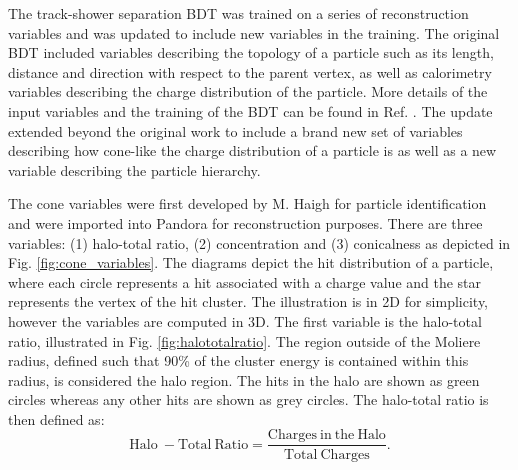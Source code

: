 The track-shower separation BDT was trained on a series of reconstruction variables and was updated to include new variables in the training.
The original BDT included variables describing the topology of a particle such as its length, distance and direction with respect to the parent vertex, as well as calorimetry variables describing the charge distribution of the particle.
More details of the input variables and the training of the BDT can be found in Ref. \cite{EdPhD}.
The update extended beyond the original work to include a brand new set of variables describing how cone-like the charge distribution of a particle is as well as a new variable describing the particle hierarchy.

The cone variables were first developed by M. Haigh for particle identification \cite{warwick_pid} and were imported into Pandora for reconstruction purposes.
There are three variables: (1) halo-total ratio, (2) concentration and (3) conicalness as depicted in Fig. \ref{fig:cone_variables}.
The diagrams depict the hit distribution of a particle, where each circle represents a hit associated with a charge value and the star represents the vertex of the hit cluster.
The illustration is in 2D for simplicity, however the variables are computed in 3D.
The first variable is the halo-total ratio, illustrated in Fig. \ref{fig:halototalratio}.
The region outside of the Moliere radius, defined such that 90\% of the cluster energy is contained within this radius, is considered the halo region.
The hits in the halo are shown as green circles whereas any other hits are shown as grey circles.
The halo-total ratio is then defined as:
\begin{equation}
	\mathrm{Halo\ - Total\ Ratio = \frac{Charges\ in\ the\ Halo}{Total\ Charges}}.
\end{equation}

